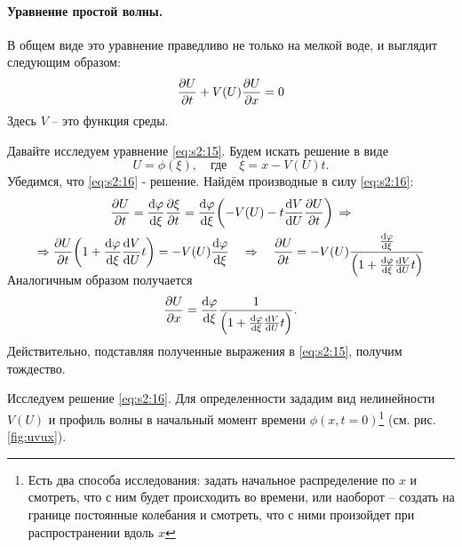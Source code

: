 \paragraph{Уравнение простой волны. } В общем виде это уравнение праведливо не только на мелкой воде, и выглядит следующим образом:
\begin{equation}
	\pdv{U}{t}+V(U)\pdv{U}{x} = 0
	\label{eq:s2:15}
\end{equation}
Здесь $V$ -- это функция среды. 

Давайте исследуем уравнение \eqref{eq:s2:15}. Будем искать решение в виде
\begin{equation}
	U = \phi(\xi), \quad \text{где}\quad
	\xi=x-V(U)t.
	\label{eq:s2:16}
\end{equation}
Убедимся, что \eqref{eq:s2:16} - решение. Найдём производные в силу \eqref{eq:s2:16}:
\begin{gather}
	\nonumber\pdv{U}{t}=\dv{\phi}{\xi}\pdv{\xi}{t}=\dv{\phi}{\xi}\qty(-V(U)-t\dv{V}{U}\pdv{U}{t})
	\,\Rightarrow \\ \Rightarrow 
	\pdv{U}{t}\qty(1+\dv{\phi}{\xi}\dv{V}{U}t)=-V(U)\dv{\phi}{\xi}
	\vspace{-0.5em}\quad \Rightarrow \vspace{-0.5em}\quad
	\pdv{U}{t}=-V(U)\frac{\dv{\phi}{\xi}}{\qty(1+\dv{\phi}{\xi}\dv{V}{U}t)}
	\label{eq:s2:6}
\end{gather}
Аналогичным образом получается
\begin{gather*}
	\pdv{U}{x}=\dv{\varphi}{\xi} \frac{1}{\qty(1+\dv{\varphi}{\xi}\dv{V}{U}t)}.
\end{gather*}
Действительно, подставляя полученные выражения в \eqref{eq:s2:15}, получим тождество.

Исследуем решение \eqref{eq:s2:16}. Для определенности зададим вид нелинейности $V(U)$ и профиль волны в начальный момент времени $\phi(x,t=0)$\footnote{Есть два способа исследования: задать начальное распределение по $x$ и смотреть, что с ним будет происходить во времени, или наоборот -- создать на границе постоянные колебания и смотреть, что с ними произойдет при распространении вдоль $x$} (см. рис. \ref{fig:uvux}).

